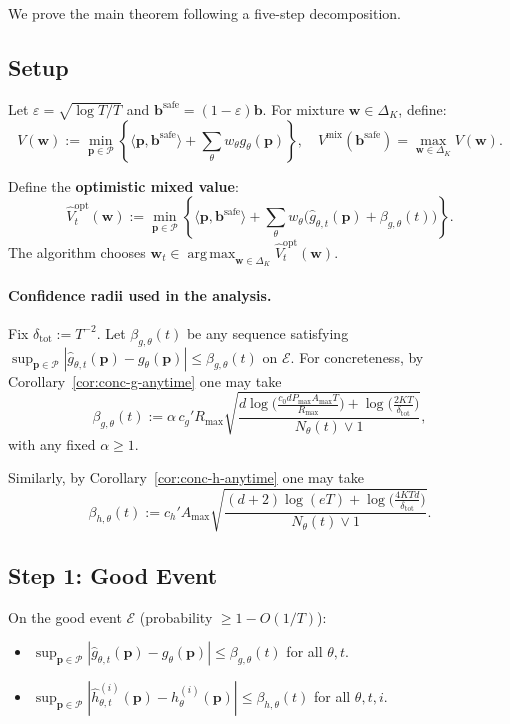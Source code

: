 \documentclass[11pt]{article}
\newcommand{\bb}{\mathbf{b}}
\newcommand{\bbS}{\mathbf{b}^{\mathrm{safe}}}
\newcommand{\bp}{\mathbf{p}}
\newcommand{\bw}{\mathbf{w}}
\newcommand{\cP}{\mathcal{P}}
\newcommand{\cE}{\mathcal{E}}
\DeclareMathOperator*{\argmax}{arg\,max}
\begin{document}
We prove the main theorem following a five-step decomposition.

\subsection{Setup}

Let $\varepsilon = \sqrt{\log T / T}$ and $\bbS = (1-\varepsilon)\bb$. For mixture $\bw \in \Delta_K$, define:
\[
V(\bw) := \min_{\bp \in \cP} \left\{ \langle \bp, \bbS \rangle + \sum_\theta w_\theta g_\theta(\bp) \right\},
\quad
V^{\mathrm{mix}}(\bbS) = \max_{\bw \in \Delta_K} V(\bw).
\]

Define the \textbf{optimistic mixed value}:
\[
\widehat{V}_t^{\mathrm{opt}}(\bw) := \min_{\bp \in \cP} \left\{ \langle \bp, \bbS \rangle + \sum_\theta w_\theta \big(\widehat{g}_{\theta,t}(\bp) + \beta_{g,\theta}(t)\big) \right\}.
\]
The algorithm chooses $\bw_t \in \argmax_{\bw \in \Delta_K} \widehat{V}_t^{\mathrm{opt}}(\bw)$.

\paragraph{Confidence radii used in the analysis.}
Fix $\delta_{\mathrm{tot}}:=T^{-2}$. Let $\beta_{g,\theta}(t)$ be any sequence satisfying
$\sup_{\bp\in\cP}|\widehat g_{\theta,t}(\bp)-g_\theta(\bp)|\le \beta_{g,\theta}(t)$ on $\mathcal E$.
For concreteness, by Corollary~\ref{cor:conc-g-anytime} one may take
\[
\beta_{g,\theta}(t)
:=
\alpha\,c_g' R_{\max}\sqrt{
\frac{d\log\!\Big(\frac{c_0 d P_{\max} A_{\max} T}{R_{\max}}\Big)+\log\!\Big(\frac{2KT}{\delta_{\mathrm{tot}}}\Big)}
{N_\theta(t)\vee 1}},
\]
with any fixed $\alpha\ge 1$.

Similarly, by Corollary~\ref{cor:conc-h-anytime} one may take
\[
\beta_{h,\theta}(t)
:=
c_h' A_{\max}\sqrt{
\frac{(d+2)\log(eT)+\log\!\Big(\frac{4KTd}{\delta_{\mathrm{tot}}}\Big)}
{N_\theta(t)\vee 1}}.
\]

\subsection{Step 1: Good Event}

On the good event $\cE$ (probability $\ge 1 - O(1/T)$):
\begin{itemize}
    \item $\sup_{\bp \in \cP} |\widehat{g}_{\theta,t}(\bp) - g_\theta(\bp)| \le \beta_{g,\theta}(t)$ for all $\theta, t$.
    \item $\sup_{\bp \in \cP} |\widehat{h}_{\theta,t}^{(i)}(\bp) - h_\theta^{(i)}(\bp)| \le \beta_{h,\theta}(t)$ for all $\theta, t, i$.
\end{itemize}
\end{document}
